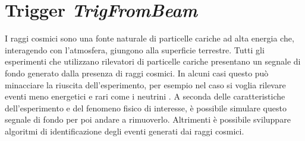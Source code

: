 \documentclass[../main.tex]{subfiles}
\begin{document}
\section{Trigger \emph{TrigFromBeam}}
I raggi cosmici sono una fonte naturale di particelle cariche ad alta energia che, interagendo con l'atmosfera, giungono alla superficie terrestre. Tutti gli esperimenti che utilizzano rilevatori di particelle cariche presentano un segnale di fondo generato dalla presenza di raggi cosmici. In alcuni casi questo può minacciare la riuscita dell'esperimento, per esempio nel caso si voglia rilevare eventi meno energetici e rari come i neutrini \cite{cosmicrays}.
A seconda delle caratteristiche dell'esperimento e del fenomeno fisico di interesse, è possibile simulare questo segnale di fondo per poi andare a rimuoverlo. Altrimenti è possibile sviluppare algoritmi di identificazione degli eventi generati dai raggi cosmici.
\end{document}
